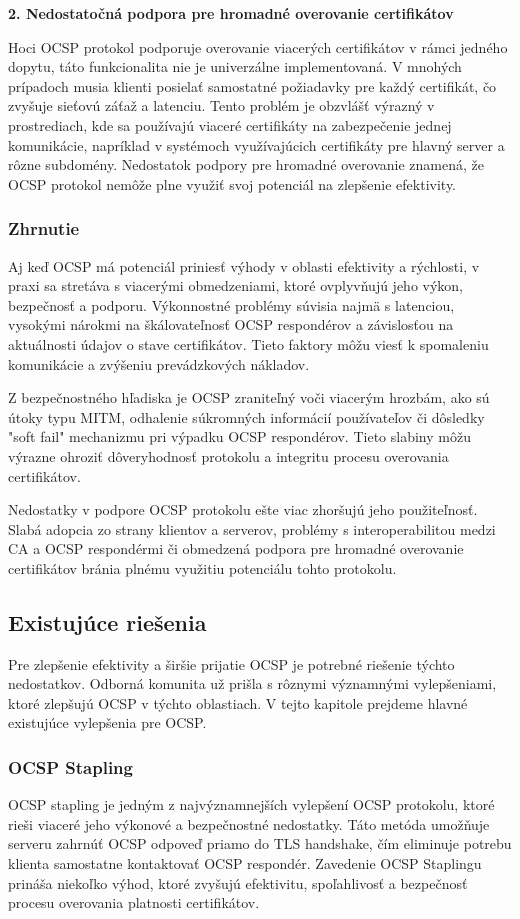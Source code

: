 \documentclass[12pt, twoside]{book}
\newcommand{\subsubsubsection}[1]{%
  \vspace{0.2em}  
  \textbf{#1} \\[0.2em]
  \hspace*{\parindent}
}
\begin{document}
\subsubsubsection{2. Nedostatočná podpora pre hromadné overovanie certifikátov}
Hoci OCSP protokol podporuje overovanie viacerých certifikátov v rámci jedného dopytu, táto funkcionalita nie je univerzálne implementovaná. V mnohých prípadoch musia klienti posielať samostatné požiadavky pre každý certifikát, čo zvyšuje sieťovú záťaž a latenciu. Tento problém je obzvlášť výrazný v prostrediach, kde sa používajú viaceré certifikáty na zabezpečenie jednej komunikácie, napríklad v systémoch využívajúcich certifikáty pre hlavný server a rôzne subdomény. Nedostatok podpory pre hromadné overovanie znamená, že OCSP protokol nemôže plne využiť svoj potenciál na zlepšenie efektivity.


\subsubsection{Zhrnutie}
Aj keď OCSP má potenciál priniesť výhody v oblasti efektivity a rýchlosti, v praxi sa stretáva s viacerými obmedzeniami, ktoré ovplyvňujú jeho výkon, bezpečnosť a podporu. Výkonnostné problémy súvisia najmä s latenciou, vysokými nárokmi na škálovateľnosť OCSP respondérov a závislosťou na aktuálnosti údajov o stave certifikátov. Tieto faktory môžu viesť k spomaleniu komunikácie a zvýšeniu prevádzkových nákladov.

Z bezpečnostného hľadiska je OCSP zraniteľný voči viacerým hrozbám, ako sú útoky typu MITM, odhalenie súkromných informácií používateľov či dôsledky "soft fail" mechanizmu pri výpadku OCSP respondérov. Tieto slabiny môžu výrazne ohroziť dôveryhodnosť protokolu a integritu procesu overovania certifikátov.

Nedostatky v podpore OCSP protokolu ešte viac zhoršujú jeho použiteľnosť. Slabá adopcia zo strany klientov a serverov, problémy s interoperabilitou medzi CA a OCSP respondérmi či obmedzená podpora pre hromadné overovanie certifikátov bránia plnému využitiu potenciálu tohto protokolu. 


\subsection{Existujúce riešenia}
Pre zlepšenie efektivity a širšie prijatie OCSP je potrebné riešenie týchto nedostatkov. Odborná komunita už prišla s rôznymi významnými vylepšeniami, ktoré zlepšujú OCSP v týchto oblastiach. V tejto kapitole prejdeme hlavné existujúce vylepšenia pre OCSP.


\subsubsection{OCSP Stapling}
OCSP stapling je jedným z najvýznamnejších vylepšení OCSP protokolu, ktoré rieši viaceré jeho výkonové a bezpečnostné nedostatky. Táto metóda umožňuje serveru zahrnúť OCSP odpoveď priamo do TLS handshake, čím eliminuje potrebu klienta samostatne kontaktovať OCSP respondér. Zavedenie OCSP Staplingu prináša niekoľko výhod, ktoré zvyšujú efektivitu, spoľahlivosť a bezpečnosť procesu overovania platnosti certifikátov.
\end{document}
